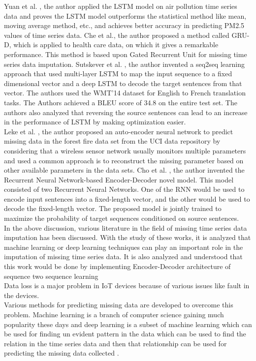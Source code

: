 Yuan et al. \cite{29}, the author applied the LSTM model on air pollution time series data and proves the LSTM model outperforms the statistical method like mean, moving average method, etc., and achieves better accuracy in predicting PM2.5 values of time series data. Che et al.\cite{30}, the author proposed a method called GRU-D, which is applied to health care data, on which it gives a remarkable performance. This method is based upon Gated Recurrent Unit for missing time series data imputation. Sutskever et al. \cite{31}, the author invented a seq2seq learning approach that used multi-layer LSTM to map the input sequence to a fixed dimensional vector and a deep LSTM to decode the target sentences from that vector. The authors used the WMT'14 dataset for English to French translation tasks. The Authors achieved a BLEU score of 34.8 on the entire test set. The authors also analyzed that reversing the source sentences can lead to an increase in the performance of LSTM by making optimization easier\cite{25}.
\\
 
Leke et al. \cite{32}, the author proposed an auto-encoder neural network to predict missing data in the forest ﬁre data set from the UCI data repository by considering that a wireless sensor network usually monitors multiple parameters and used a common approach is to reconstruct the missing parameter based on other available parameters in the data sets. Cho et al. \cite{33}, the author invented the Recurrent Neural Network-based Encoder-Decoder novel model. This model consisted of two Recurrent Neural Networks. One of the RNN would be used to encode input sentences into a fixed-length vector, and the other would be used to decode the fixed-length vector. The proposed model is jointly trained to maximize the probability of target sequences conditioned on source sentences.
\\
 
In the above discussion, various literature in the field of missing time series data imputation has been discussed. With the study of these works, it is analyzed that machine learning or deep learning techniques can play an important role in the imputation of missing time series data\cite{34}. It is also analyzed and understood that this work would be done by implementing Encoder-Decoder architecture of sequence two sequence learning \cite{35, 36, 37}
\\

Data loss is a major problem in IoT devices because of various issues like fault in the devices. \cite{21}
\\
Various methods for predicting missing data are developed to overcome this problem. Machine learning is a branch of computer science gaining much popularity these days and deep learning is a subset of machine learning which can be used for finding un evident pattern in the data which can be used to find the relation in the time series data and then that relationship can be used for predicting the missing data collected \cite{21}. 
\\

